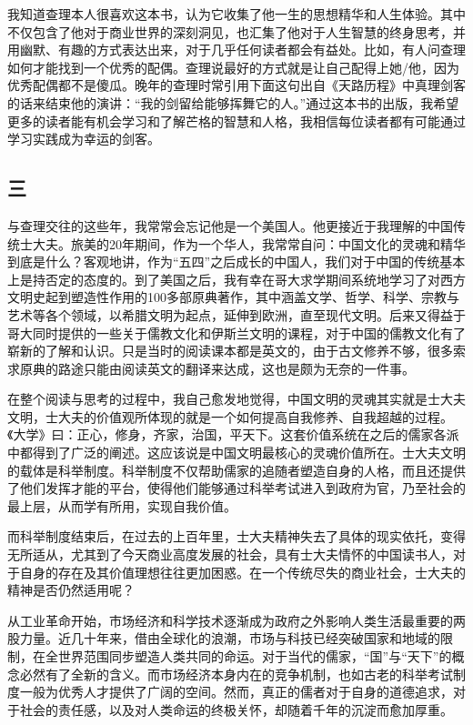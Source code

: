 我知道查理本人很喜欢这本书，认为它收集了他一生的思想精华和人生体验。其中不仅包含了他对于商业世界的深刻洞见，也汇集了他对于人生智慧的终身思考，并用幽默、有趣的方式表达出来，对于几乎任何读者都会有益处。比如，有人问查理如何才能找到一个优秀的配偶。查理说最好的方式就是让自己配得上她/他，因为优秀配偶都不是傻瓜。晚年的查理时常引用下面这句出自《天路历程》中真理剑客的话来结束他的演讲：“我的剑留给能够挥舞它的人。”通过这本书的出版，我希望更多的读者能有机会学习和了解芒格的智慧和人格，我相信每位读者都有可能通过学习实践成为幸运的剑客。
\par

\subsection*{三}

与查理交往的这些年，我常常会忘记他是一个美国人。他更接近于我理解的中国传统士大夫。旅美的20年期间，作为一个华人，我常常自问：中国文化的灵魂和精华到底是什么？客观地讲，作为“五四”之后成长的中国人，我们对于中国的传统基本上是持否定的态度的。到了美国之后，我有幸在哥大求学期间系统地学习了对西方文明史起到塑造性作用的100多部原典著作，其中涵盖文学、哲学、科学、宗教与艺术等各个领域，以希腊文明为起点，延伸到欧洲，直至现代文明。后来又得益于哥大同时提供的一些关于儒教文化和伊斯兰文明的课程，对于中国的儒教文化有了崭新的了解和认识。只是当时的阅读课本都是英文的，由于古文修养不够，很多索求原典的路途只能由阅读英文的翻译来达成，这也是颇为无奈的一件事。
\par

在整个阅读与思考的过程中，我自己愈发地觉得，中国文明的灵魂其实就是士大夫文明，士大夫的价值观所体现的就是一个如何提高自我修养、自我超越的过程。《大学》曰：正心，修身，齐家，治国，平天下。这套价值系统在之后的儒家各派中都得到了广泛的阐述。这应该说是中国文明最核心的灵魂价值所在。士大夫文明的载体是科举制度。科举制度不仅帮助儒家的追随者塑造自身的人格，而且还提供了他们发挥才能的平台，使得他们能够通过科举考试进入到政府为官，乃至社会的最上层，从而学有所用，实现自我价值。
\par

而科举制度结束后，在过去的上百年里，士大夫精神失去了具体的现实依托，变得无所适从，尤其到了今天商业高度发展的社会，具有士大夫情怀的中国读书人，对于自身的存在及其价值理想往往更加困惑。在一个传统尽失的商业社会，士大夫的精神是否仍然适用呢？
\par

从工业革命开始，市场经济和科学技术逐渐成为政府之外影响人类生活最重要的两股力量。近几十年来，借由全球化的浪潮，市场与科技已经突破国家和地域的限制，在全世界范围同步塑造人类共同的命运。对于当代的儒家，“国”与“天下”的概念必然有了全新的含义。而市场经济本身内在的竞争机制，也如古老的科举考试制度一般为优秀人才提供了广阔的空间。然而，真正的儒者对于自身的道德追求，对于社会的责任感，以及对人类命运的终极关怀，却随着千年的沉淀而愈加厚重。
\par

